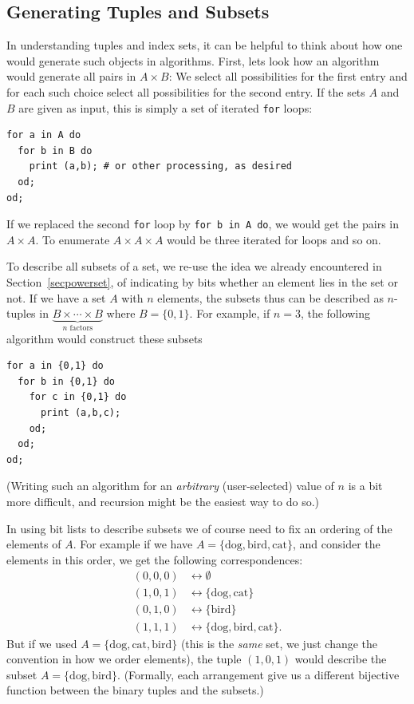 \subsection{Generating Tuples and Subsets}


In understanding tuples and index sets, it can be helpful to think about how
one would generate such objects in algorithms. First, lets look how an
algorithm would generate all pairs in $A\times B$: We select all
possibilities for the first entry and for each such choice select all
possibilities for the second entry. If the sets $A$ and $B$
are given as input, this is simply a set of iterated \texttt{for} loops:
\begin{verbatim}
for a in A do
  for b in B do
    print (a,b); # or other processing, as desired
  od;
od;
\end{verbatim}
If we replaced the second \texttt{for} loop by \texttt{for b in A do}, we
would get the pairs in $A\times A$. To enumerate $A\times A\times A$ would be
three iterated for loops and so on.
\medskip

To describe all subsets of a set, we re-use the idea we already
encountered in Section~\ref{secpowerset}, of indicating by bits whether an
element lies in the set or not. If we have a set $A$ with $n$ elements, the
subsets thus can be described as $n$-tuples in
$\underbrace{B\times\cdots\times B}_{\mbox{$n$ factors}}$ where $B=\{0,1\}$.
For example, if $n=3$, the following algorithm would construct these subsets
\begin{verbatim}
for a in {0,1} do
  for b in {0,1} do
    for c in {0,1} do
      print (a,b,c);
    od;
  od;
od;
\end{verbatim}
(Writing such an algorithm for an {\em arbitrary} (user-selected) value of
$n$ is a bit more difficult, and recursion might be the easiest way to do
so.)

In using bit lists to describe subsets we of course need to fix an ordering
of the elements of $A$. For example if we have
$A=\{\text{dog},\text{bird},\text{cat}\}$, and consider the elements in this
order, we get the following correspondences:
\begin{align*}
(0,0,0) &\longleftrightarrow \emptyset\\
(1,0,1) &\longleftrightarrow \{\text{dog},\text{cat}\}\\
(0,1,0) &\longleftrightarrow \{\text{bird}\}\\
(1,1,1) &\longleftrightarrow \{\text{dog},\text{bird},\text{cat}\}.
\end{align*}
But if we used
$A=\{\text{dog},\text{cat},\text{bird}\}$ (this is the {\em same} set, we
just change the convention in how we order elements), the tuple $(1,0,1)$ would
describe the subset $A=\{\text{dog},\text{bird}\}$. (Formally, each
arrangement give us a different
bijective function between the binary tuples and the subsets.)

